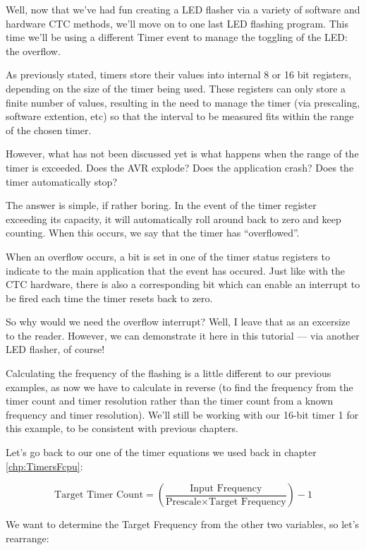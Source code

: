 \documentclass[a4paper,oneside,notitlepage]{book}
\begin{document}
Well, now that we've had fun creating a LED flasher via a variety of software and hardware CTC methods, we'll move on to one last LED flashing program. This time we'll be using a different Timer event to manage the toggling of the LED: the overflow.

As previously stated, timers store their values into internal 8 or 16 bit registers, depending on the size of the timer being used. These registers can only store a finite number of values, resulting in the need to manage the timer (via prescaling, software extention, etc) so that the interval to be measured fits within the range of the chosen timer.

However, what has not been discussed yet is what happens when the range of the timer is exceeded. Does the AVR explode? Does the application crash? Does the timer automatically stop?

The answer is simple, if rather boring. In the event of the timer register exceeding its capacity, it will automatically roll around back to zero and keep counting. When this occurs, we say that the timer has ``overflowed''.

When an overflow occurs, a bit is set in one of the timer status registers to indicate to the main application that the event has occured. Just like with the CTC hardware, there is also a corresponding bit which can enable an interrupt to be fired each time the timer resets back to zero.

So why would we need the overflow interrupt? Well, I leave that as an excersize to the reader. However, we can demonstrate it here in this tutorial --- via another LED flasher, of course!

Calculating the frequency of the flashing is a little different to our previous examples, as now we have to calculate in reverse (to find the frequency from the timer count and timer resolution rather than the timer count from a known frequency and timer resolution). We'll still be working with our 16-bit timer 1 for this example, to be consistent with previous chapters.

Let's go back to our one of the timer equations we used back in chapter \ref{chp:TimersFcpu}:

\begin{displaymath}
\text{Target Timer Count} = (\frac{\text{Input Frequency}}{\text{Prescale} \times \text{Target Frequency}}) - 1
\end{displaymath}

We want to determine the Target Frequency from the other two variables, so let's rearrange:
\end{document}
